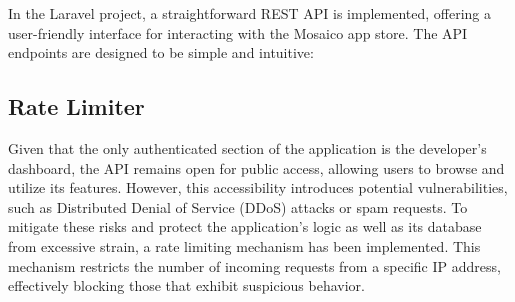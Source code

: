 In the Laravel project, a straightforward REST API is implemented, offering a user-friendly interface for interacting with the Mosaico app store. The API endpoints are designed to be simple and intuitive:

\begin{center}  \end{center}

\subsection{Rate Limiter} Given that the only authenticated section of the application is the developer's dashboard, the API remains open for public access, allowing users to browse and utilize its features. However, this accessibility introduces potential vulnerabilities, such as Distributed Denial of Service (DDoS) attacks or spam requests. To mitigate these risks and protect the application’s logic as well as its database from excessive strain, a rate limiting mechanism has been implemented. This mechanism restricts the number of incoming requests from a specific IP address, effectively blocking those that exhibit suspicious behavior.